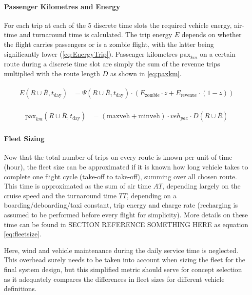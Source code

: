 \paragraph{Passenger Kilometres and Energy}

For each trip at each of the 5 discrete time slots the required vehicle energy, air-time and turnaround time is calculated. The trip energy $E$ depends on whether the flight carries passengers or is a zombie flight, with the latter being significantly lower (\autoref{eq:EnergyTrip}). Passenger kilometres $\text{pax}_{km}$ on a certain route during a discrete time slot are simply the sum of the revenue trips multiplied with the route length $D$ as shown in \autoref{eq:paxkm}.

\begin{align} \label{eq:EnergyTrip}
\begin{split}
    E(R\cup\bar{R}, t_{\text{day}}) &= \Psi(R\cup\bar{R}, t_{\text{day}}) \cdot \left(E_{\text{zombie}} \cdot z + E_{\text{revenue}} \cdot (1-z) \right)
\end{split}
\end{align}

\begin{align} \label{eq:paxkm}
\begin{split}
    \text{pax}_{km}(R\cup\bar{R}, t_{\text{day}}) &= \left( \text{maxveh} + \text{minveh} \right) \cdot veh_{pax} \cdot D(R\cup\bar{R})
\end{split}
\end{align}


\paragraph{Fleet Sizing}

Now that the total number of trips on every route is known per unit of time (hour), the fleet size can be approximated if it is known how long vehicle takes to complete one flight cycle (take-off to take-off), summing over all chosen route. This time is approximated as the sum of air time $AT$, depending largely on the cruise speed and the turnaround time $TT$, depending on a boarding/deboarding/taxi constant, trip energy and charge rate (recharging is assumed to be performed before every flight for simplicity). More details on these time can be found in SECTION REFERENCE SOMETHING HERE as equation \autoref{eq:fleetsize}.

Here, wind and vehicle maintenance during the daily service time is neglected. This overhead surely needs to be taken into account when sizing the fleet for the final system design, but this simplified metric should serve for concept selection as it adequately compares the differences in fleet sizes for different vehicle definitions.

